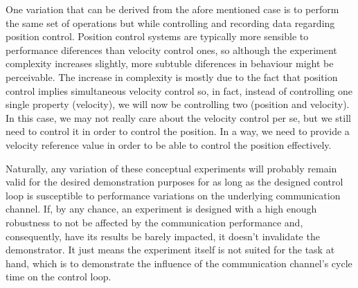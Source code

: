 One variation that can be derived from the afore mentioned case is to perform the same set of operations but while controlling and recording data regarding position control.
Position control systems are typically more sensible to performance diferences than velocity control ones, so although the experiment complexity increases slightly, more subtuble diferences in behaviour might be perceivable.
The increase in complexity is mostly due to the fact that position control implies simultaneous velocity control so, in fact, instead of controlling one single property (velocity), we will now be controlling two (position and velocity).
In this case, we may not really care about the velocity control per se, but we still need to control it in order to control the position.
In a way, we need to provide a velocity reference value in order to be able to control the position effectively.

Naturally, any variation of these conceptual experiments will probably remain valid for the desired demonstration purposes for as long as the designed control loop is susceptible to performance variations on the underlying communication channel.
If, by any chance, an experiment is designed with a high enough robustness to not be affected by the communication performance and, consequently, have its results be barely impacted, it doesn't invalidate the demonstrator.
It just means the experiment itself is not suited for the task at hand, which is to demonstrate the influence of the communication channel's cycle time on the control loop.


